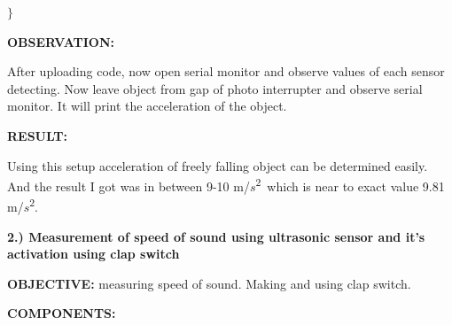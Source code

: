 \documentclass[12pt]{article}
\begin{document}
{\fontsize{14pt}{16.8pt}\selectfont $ \} $ \par}\par

\vspace{\baselineskip}

\vspace{\baselineskip}
{\fontsize{14pt}{16.8pt}\selectfont \textbf{OBSERVATION:}\par}\par

\vspace{\baselineskip}
{\fontsize{14pt}{16.8pt}\selectfont After uploading code, now open serial monitor and observe values of each sensor detecting. Now leave object from gap of photo interrupter and observe serial monitor. It will print the acceleration of the object.\par}\par


\vspace{\baselineskip}
{\fontsize{14pt}{16.8pt}\selectfont \textbf{RESULT:}\par}\par


\vspace{\baselineskip}
{\fontsize{14pt}{16.8pt}\selectfont Using this setup acceleration of freely falling object can be determined easily. And the result I got was in between 9-10 m/$s$\textsuperscript{2}\  which is near to exact value 9.81 m/$s$\textsuperscript{2}.\par}


\newpage
\par

\vspace{\baselineskip}
{\fontsize{14pt}{16.8pt}\selectfont \textbf{2.) Measurement of speed of sound using ultrasonic sensor and it’s activation using clap switch}\par}\par

\vspace{\baselineskip}
{\fontsize{14pt}{16.8pt}\selectfont \textbf{OBJECTIVE:} measuring speed of sound. Making and using clap switch.\par}\par

\vspace{\baselineskip}
{\fontsize{14pt}{16.8pt}\selectfont \textbf{COMPONENTS: }\par}\par
\end{document}
